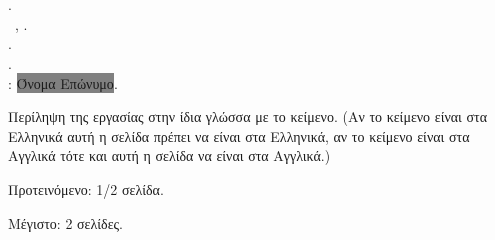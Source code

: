 \chapter*{\abstractname}
\addstarredchapter{\abstractname} %
\makeatletter

\@author.\\
\cseabstracttype\ifPhD\else\ \cseabstractcs\fi, \@date.\\
\cseabstractdpt.\\
\@title.\\
\cseabstractsup: \colorbox{gray}{Όνομα Επώνυμο}. %

\makeatother
\bigskip
\bigskip

\noindent Περίληψη της εργασίας στην ίδια γλώσσα με το 
κείμενο. (Αν το κείμενο είναι στα Ελληνικά αυτή η σελίδα
πρέπει να είναι στα Ελληνικά, αν το κείμενο είναι στα
Αγγλικά τότε και αυτή η σελίδα να είναι στα Αγγλικά.)

\bigskip

\noindent Προτεινόμενο: 1/2 σελίδα.

\noindent Μέγιστο: 2 σελίδες.